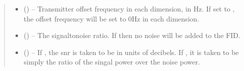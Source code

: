 \documentclass[letterpaper,10pt,english]{sphinxmanual}
\begin{document}
\begin{fulllineitems}
\begin{quote}
\begin{description}
\begin{itemize}
\item {} 
\sphinxAtStartPar
{} (\sphinxstyleliteralemphasis{\sphinxupquote{{[}}}\sphinxstyleliteralemphasis{\sphinxupquote{{]}}}\sphinxstyleliteralemphasis{\sphinxupquote{, }}\sphinxstyleliteralemphasis{\sphinxupquote{{[}}}\sphinxstyleliteralemphasis{\sphinxupquote{, }}\sphinxstyleliteralemphasis{\sphinxupquote{{]}}}\sphinxstyleliteralemphasis{\sphinxupquote{, }}) – Transmitter offset frequency in each dimension, in Hz. If set to
, the offset frequency will be set to 0Hz in each dimension.

\item {} 
\sphinxAtStartPar
{} (\sphinxstyleliteralemphasis{\sphinxupquote{, }}) – The signal\sphinxhyphen{}to\sphinxhyphen{}noise ratio. If  then no noise will be added
to the FID.

\item {} 
\sphinxAtStartPar
{} (\sphinxstyleliteralemphasis{\sphinxupquote{, }}) – If , the snr is taken to be in units of decibels. If ,
it is taken to be simply the ratio of the singal power over the
noise power.


\end{itemize}
\end{description}
\end{quote}
\end{fulllineitems}
\end{document}
